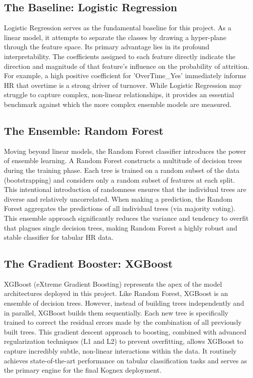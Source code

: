 \subsection{The Baseline: Logistic Regression}
Logistic Regression serves as the fundamental baseline for this project. As a linear model, it attempts to separate the classes by drawing a hyper-plane through the feature space. Its primary advantage lies in its profound interpretability. The coefficients assigned to each feature directly indicate the direction and magnitude of that feature's influence on the probability of attrition. For example, a high positive coefficient for 'OverTime\_Yes' immediately informs HR that overtime is a strong driver of turnover. While Logistic Regression may struggle to capture complex, non-linear relationships, it provides an essential benchmark against which the more complex ensemble models are measured.

\subsection{The Ensemble: Random Forest}
Moving beyond linear models, the Random Forest classifier introduces the power of ensemble learning. A Random Forest constructs a multitude of decision trees during the training phase. Each tree is trained on a random subset of the data (bootstrapping) and considers only a random subset of features at each split. This intentional introduction of randomness ensures that the individual trees are diverse and relatively uncorrelated. When making a prediction, the Random Forest aggregates the predictions of all individual trees (via majority voting). This ensemble approach significantly reduces the variance and tendency to overfit that plagues single decision trees, making Random Forest a highly robust and stable classifier for tabular HR data.

\subsection{The Gradient Booster: XGBoost}
XGBoost (eXtreme Gradient Boosting) represents the apex of the model architectures deployed in this project. Like Random Forest, XGBoost is an ensemble of decision trees. However, instead of building trees independently and in parallel, XGBoost builds them sequentially. Each new tree is specifically trained to correct the residual errors made by the combination of all previously built trees. This gradient descent approach to boosting, combined with advanced regularization techniques (L1 and L2) to prevent overfitting, allows XGBoost to capture incredibly subtle, non-linear interactions within the data. It routinely achieves state-of-the-art performance on tabular classification tasks and serves as the primary engine for the final Kognex deployment.

